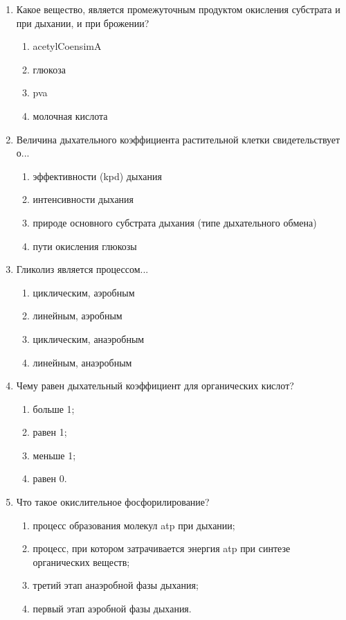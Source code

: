 \begin{enumerate}
\item Какое вещество, является промежуточным продуктом окисления субстрата и при дыхании, и при брожении?
\begin{enumerate}
	\item \gls{acetylCoensimA}           
	\item глюкоза
	\item \gls{pva}                        
	\item молочная кислота
\end{enumerate}

\item Величина дыхательного коэффициента растительной клетки свидетельствует о...
\begin{enumerate}
	\item эффективности (\gls{kpd}) дыхания
	\item интенсивности дыхания
	\item природе основного субстрата дыхания (типе дыхательного
обмена)
	\item пути окисления глюкозы
\end{enumerate}

\item Гликолиз является процессом...
\begin{enumerate}
	\item циклическим, аэробным            
	\item линейным, аэробным
	\item циклическим, анаэробным        
	\item линейным, анаэробным
\end{enumerate}

\item Чему равен дыхательный коэффициент для органических кислот?
\begin{enumerate}
	\item больше 1; 
	\item равен 1; 
	\item меньше 1; 
	\item равен 0.
\end{enumerate}

\item Что такое окислительное фосфорилирование?
\begin{enumerate}
	\item процесс образования молекул \gls{atp} при дыхании; 
	\item процесс, при котором затрачивается энергия \gls{atp} при синтезе органических веществ; 
	\item третий этап анаэробной фазы дыхания; 
	\item первый этап аэробной фазы дыхания.
\end{enumerate}

\end{enumerate}
